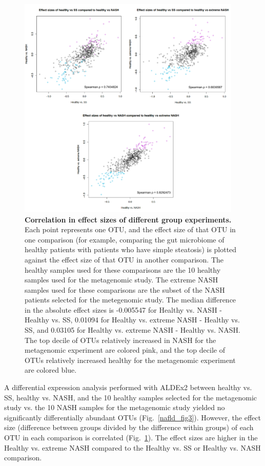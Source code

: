 \begin{figure}[h]
\begin{center}
\includegraphics[width=0.95\textwidth]{nafld_16s_effect_sizes.png}
\caption{\textbf{Correlation in effect sizes of different group experiments.} Each point represents one OTU, and the effect size of that OTU in one comparison (for example, comparing the gut microbiome of healthy patients with patients who have simple steatosis) is plotted against the effect size of that OTU in another comparison. The healthy samples used for these comparisons are the 10 healthy samples used for the metagenomic study. The extreme NASH samples used for these comparisons are the subset of the NASH patients selected for the metegenomic study. The median difference in the absolute effect sizes is -0.005547 for Healthy vs. NASH - Healthy vs. SS, 0.01094 for Healthy vs. extreme NASH - Healthy vs. SS, and 0.03105 for Healthy vs. extreme NASH - Healthy vs. NASH. The top decile of OTUs relatively increased in NASH for the metagenomic experiment are colored pink, and the top decile of OTUs relatively increased healthy for the metagenomic experiment are colored blue.}
\end{center}
\label{nafld_fig4}
\end{figure}

\FloatBarrier

A differential expression analysis performed with ALDEx2 between healthy vs. SS, healthy vs. NASH, and the 10 healthy samples selected for the metagenomic study vs. the 10 NASH samples for the metagenomic study yielded no significantly differentially abundant OTUs (Fig.~\ref{nafld_fig3}). However, the effect size (difference between groups divided by the difference within groups) of each OTU in each comparison is correlated (Fig.~\ref{nafld_fig4}). The effect sizes are higher in the Healthy vs. extreme NASH compared to the Healthy vs. SS or Healthy vs. NASH comparison.

